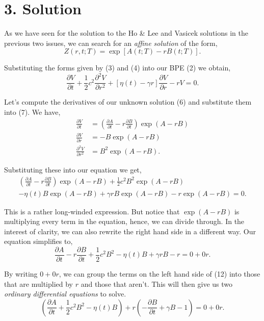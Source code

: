 \documentclass[11pt]{article}
\begin{document}
\section*{3. Solution}
As we have seen for the solution to the Ho \& Lee and Vasicek solutions in the previous two issues, we can search for an \textit{affine solution} of the form,
\begin{equation}
    Z(r,t;T) = \exp [ A(t;T) - r B(t;T)].
\end{equation}

Substituting the forms given by (3) and (4) into our BPE (2) we obtain,
\begin{equation}
    \frac{\partial V}{\partial t} + \frac{1}{2} c^2 \frac{\partial^2 V}{\partial r^2} + [\eta(t) - \gamma r] \frac{\partial V}{\partial r} - rV = 0.
\end{equation}

Let's compute the derivatives of our unknown solution (6) and substitute them into (7). We have,
\begin{align}
    \frac{\partial V}{\partial t} &= \left( \frac{\partial A}{\partial t} - r \frac{\partial B}{\partial t} \right) \exp ( A - rB) \\
    \frac{\partial V}{\partial r} &= -B \exp (A - rB) \\
    \frac{\partial^2 V}{\partial r^2} &= B^2 \exp (A-rB).
\end{align}

Substituting these into our equation we get,
\begin{multline}
    \left( \frac{\partial A}{\partial t} - r \frac{\partial B}{\partial t} \right) \exp ( A - rB) + \frac{1}{2} c^2 B^2 \exp (A-rB) \\ - \eta(t) B \exp (A - rB) + \gamma r B \exp (A - rB) - r \exp (A - rB) = 0.
\end{multline}

This is a rather long-winded expression. But notice that $\exp (A - rB)$ is multiplying every term in the equation, hence, we can divide through. In the interest of clarity, we can also rewrite the right hand side in a different way. Our equation simplifies to,
\begin{equation}
    \frac{\partial A}{\partial t} - r \frac{\partial B}{\partial t}  + \frac{1}{2} c^2 B^2 - \eta(t) B + \gamma r B - r = 0 + 0r.
\end{equation}

By writing $0 + 0r$, we can group the terms on the left hand side of (12) into those that are multiplied by $r$ and those that aren't. This will then give us two \textit{ordinary differential equations} to solve.
\begin{equation}
    \left( \frac{\partial A}{\partial t} + \frac{1}{2} c^2 B^2 - \eta(t) B \right) + r \left( -\frac{\partial B}{\partial t}  + \gamma B - 1 \right) = 0 + 0r. 
\end{equation}
\end{document}
